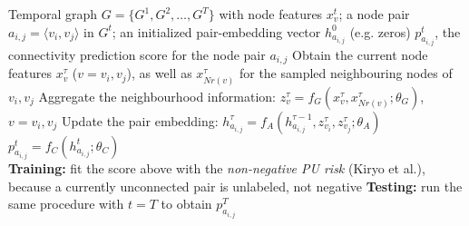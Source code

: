 \documentclass{article}
\begin{document}
\begin{algorithm}[!h]
\renewcommand{\algorithmicrequire}{\textbf{Input:}} %
\renewcommand{\algorithmicensure}{\textbf{Output:}} %
	\caption{TRP: future connection score on temporal graphs, trained by the nnPU risk (TPU)} %
	\begin{algorithmic}[1] %
	    \REQUIRE
	    Temporal graph $G=\{G^{1},G^{2},\dots,G^{T}\}$ with node features $x_{v}^{t}$;
	    a node pair $a_{i,j}=\langle v_{i},v_{j}\rangle$ in $G^{t}$;
	    an initialized pair-embedding vector $h_{a_{i,j}}^{0}$ (e.g. zeros)
	    \ENSURE
	    $p_{a_{i,j}}^{t}$, the connectivity prediction score for the node pair $a_{i,j}$
	    \STATE Obtain the current node features $x_{v}^{\tau}$ ($v=v_{i},v_{j}$), as well as
	    $x_{Nr(v)}^{\tau}$ for the sampled neighbouring nodes of $v_{i},v_{j}$
	    \STATE Aggregate the neighbourhood information:
	    $z_{v}^{\tau}=f_{G}\!\left(x_{v}^{\tau},x_{Nr(v)}^{\tau};\theta_{G}\right)$,\quad $v=v_{i},v_{j}$ %
	    \STATE Update the pair embedding:
	    $h_{a_{i,j}}^{\tau}=f_{A}\!\left(h_{a_{i,j}}^{\tau-1},z_{v_{i}}^{\tau},z_{v_{j}}^{\tau};\theta_{A}\right)$ %
	    \ENDFOR
	    \RETURN $p_{a_{i,j}}^{t}=f_{C}\!\left(h_{a_{i,j}}^{t};\theta_{C}\right)$
	    \\\hrulefill
	    \STATE \textbf{Training:} fit the score above with the \emph{non-negative PU risk}
	    (Kiryo et al.), because a currently unconnected pair is unlabeled, not negative %
	    \STATE \textbf{Testing:} run the same procedure with $t=T$ to obtain $p_{a_{i,j}}^{T}$
	\end{algorithmic}
\end{algorithm}
\end{document}
